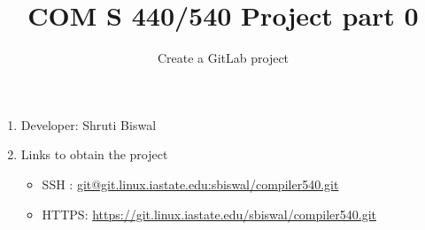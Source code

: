 \documentclass{article}
\title{COM S 440/540 Project part 0}
\date{}
\author{Create a GitLab project}
\begin{document}
\maketitle

\begin{enumerate}

\item
Developer: Shruti Biswal

\item Links to obtain the project
\begin{itemize}
\item SSH : \url{git@git.linux.iastate.edu:sbiswal/compiler540.git}

\item  HTTPS: \url{https://git.linux.iastate.edu/sbiswal/compiler540.git}
\end{itemize}

\end{enumerate}
\end{document}
